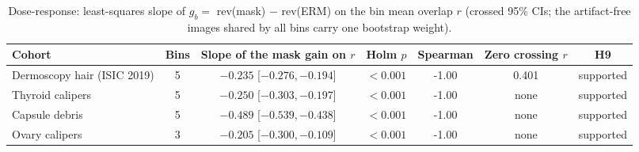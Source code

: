 \begin{table}[H]\centering\scriptsize
\caption{Dose-response: least-squares slope of $g_b=$ rev(mask) $-$ rev(ERM) on the bin mean overlap $r$ (crossed 95\% CIs; the artifact-free images shared by all bins carry one bootstrap weight).}\label{tab:s16r9}
\begin{tabular}{lcccccc}\toprule
Cohort & Bins & Slope of the mask gain on $r$ & Holm $p$ & Spearman & Zero crossing $r$ & H9 \\\midrule
Dermoscopy hair (ISIC 2019) & 5 & $-0.235$ [$-0.276, -0.194$] & $<0.001$ & -1.00 & 0.401 & supported \\
Thyroid calipers & 5 & $-0.250$ [$-0.303, -0.197$] & $<0.001$ & -1.00 & none & supported \\
Capsule debris & 5 & $-0.489$ [$-0.539, -0.438$] & $<0.001$ & -1.00 & none & supported \\
Ovary calipers & 3 & $-0.205$ [$-0.300, -0.109$] & $<0.001$ & -1.00 & none & supported \\
\bottomrule\end{tabular}
\end{table}

